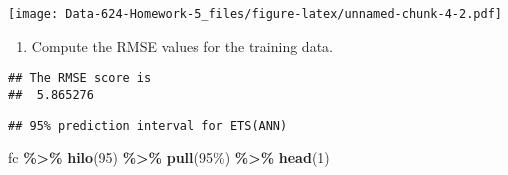 \documentclass[
]{article}
\newenvironment{Shaded}{\begin{snugshade}}{\end{snugshade}}
\newcommand{\DecValTok}[1]{\textcolor[rgb]{0.00,0.00,0.81}{#1}}
\newcommand{\FunctionTok}[1]{\textcolor[rgb]{0.13,0.29,0.53}{\textbf{#1}}}
\newcommand{\NormalTok}[1]{#1}
\newcommand{\OtherTok}[1]{\textcolor[rgb]{0.56,0.35,0.01}{#1}}
\newcommand{\SpecialCharTok}[1]{\textcolor[rgb]{0.81,0.36,0.00}{\textbf{#1}}}
\newcommand{\StringTok}[1]{\textcolor[rgb]{0.31,0.60,0.02}{#1}}
\providecommand{\tightlist}{%
  \setlength{\itemsep}{0pt}\setlength{\parskip}{0pt}}
\begin{document}
\texttt{[image: Data-624-Homework-5\_files/figure-latex/unnamed-chunk-4-2.pdf]}

\begin{enumerate}
\def\labelenumi{\alph{enumi}.}
\setcounter{enumi}{2}
\tightlist
\item
  Compute the RMSE values for the training data.
\end{enumerate}

\begin{Shaded}
\end{Shaded}

\begin{verbatim}
## The RMSE score is 
##  5.865276
\end{verbatim}

\begin{Shaded}
\end{Shaded}

\begin{verbatim}
## 95% prediction interval for ETS(ANN)
\end{verbatim}

\begin{Shaded}
\begin{Highlighting}[]
\NormalTok{fc }\SpecialCharTok{\%\textgreater{}\%} \FunctionTok{hilo}\NormalTok{(}\DecValTok{95}\NormalTok{) }\SpecialCharTok{\%\textgreater{}\%} \FunctionTok{pull}\NormalTok{(}\StringTok{\textquotesingle{}95\%\textquotesingle{}}\NormalTok{) }\SpecialCharTok{\%\textgreater{}\%} \FunctionTok{head}\NormalTok{(}\DecValTok{1}\NormalTok{)}
\end{Highlighting}
\end{Shaded}
\end{document}
